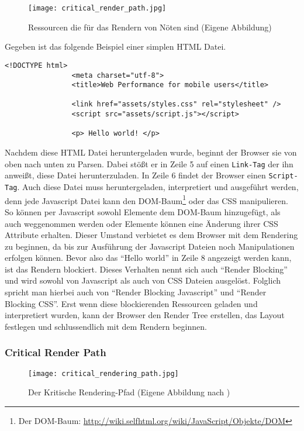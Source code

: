 			\begin{figure}[htbp]
				\begin{center}
					\texttt{[image: critical\_render\_path.jpg]}
					\caption{Ressourcen die für das Rendern von Nöten sind (Eigene Abbildung)}
					\label{fig:critical_render_path}
				\end{center}
			\end{figure}

			Gegeben ist das folgende Beispiel einer simplen HTML Datei.

			\begin{lstlisting}[captionpos=b, caption=Beispiel Code, label=beispielCode]
				<!DOCTYPE html>
				<meta charset="utf-8">
				<title>Web Performance for mobile users</title>

				<link href="assets/styles.css" rel="stylesheet" />
				<script src="assets/script.js"></script>

				<p> Hello world! </p>

			\end{lstlisting}

			Nachdem diese HTML Datei heruntergeladen wurde, beginnt der Browser sie von oben nach unten zu Parsen. Dabei stößt er in Zeile 5 auf einen \texttt{Link-Tag} der ihn anweißt, diese Datei herunterzuladen. In Zeile 6 findet der Browser einen \texttt{Script-Tag}. Auch diese Datei muss heruntergeladen, interpretiert und ausgeführt werden, denn jede Javascript Datei kann den DOM-Baum\footnote{Der DOM-Baum: \url{http://wiki.selfhtml.org/wiki/JavaScript/Objekte/DOM}} oder das CSS manipulieren. So können per Javascript sowohl Elemente dem DOM-Baum hinzugefügt, als auch weggenommen werden oder Elemente können eine Änderung ihrer CSS Attribute erhalten. Dieser Umstand verbietet es dem Browser mit dem Rendering zu beginnen, da bis zur Ausführung der Javascript Dateien noch Manipulationen erfolgen können.
			Bevor also das "`Hello world"' in Zeile 8 angezeigt werden kann, ist das Rendern blockiert. Dieses Verhalten nennt sich auch "`Render Blocking"' und wird sowohl von Javascript als auch von CSS Dateien ausgelöst. Folglich spricht man hierbei auch von "`Render Blocking Javascript"' und "`Render Blocking CSS"'. Erst wenn diese blockierenden Ressourcen geladen und interpretiert wurden, kann der Browser den Render Tree erstellen, das Layout festlegen und schlussendlich mit dem Rendern beginnen. 



		\subsubsection{Critical Render Path} %
		\label{ssub:critical_render_path}
			\begin{figure}[htbp]
				\begin{center}
					\texttt{[image: critical\_rendering\_path.jpg]}
					\caption{Der Kritische Rendering-Pfad (Eigene Abbildung nach \autocite[p. 3]{santana14})}
					\label{fig:critical_rendering_path}
				\end{center}
			\end{figure}
			
